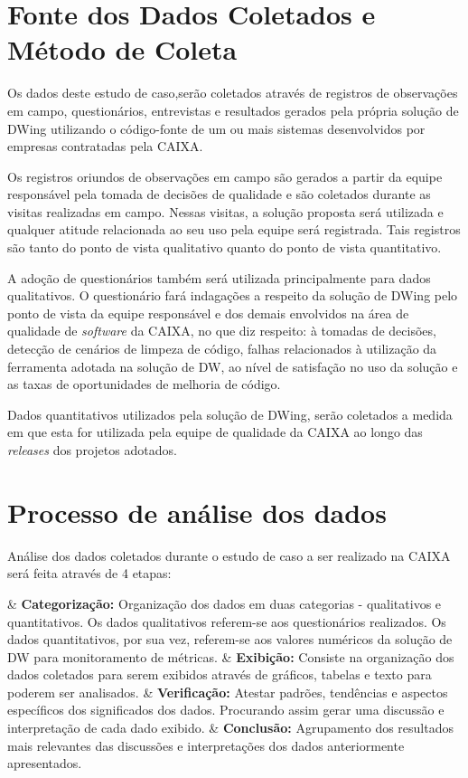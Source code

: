 \section{Fonte dos Dados Coletados e Método de Coleta}
\label{sec:fonte} 

Os dados deste estudo de caso,serão coletados através de registros de observações em campo, questionários, entrevistas e resultados gerados pela própria solução de DWing utilizando o código-fonte de um ou mais sistemas desenvolvidos por empresas contratadas pela CAIXA.

Os registros oriundos de observações em campo são gerados a partir da equipe responsável pela tomada de decisões de qualidade e são coletados durante as visitas realizadas em campo. Nessas visitas, a solução proposta será utilizada e qualquer atitude relacionada ao seu uso pela equipe será registrada. Tais registros são tanto do ponto de vista qualitativo quanto do ponto de vista quantitativo.

A adoção de questionários também será utilizada principalmente para dados qualitativos. O questionário fará indagações a respeito da solução de DWing pelo ponto de vista da equipe responsável e dos demais envolvidos na área de qualidade de \textit{software} da CAIXA, no que diz respeito: à tomadas de decisões, detecção de cenários de limpeza de código, falhas relacionados à utilização da ferramenta adotada na solução de DW, ao nível de satisfação no uso da solução e as taxas de oportunidades de melhoria de código. 

Dados quantitativos utilizados pela solução de DWing, serão coletados a medida em que esta for utilizada pela equipe de qualidade da CAIXA ao longo das \textit{releases} dos projetos adotados.

\section{Processo de análise dos dados}
\label{sec:analise} 

Análise dos dados coletados durante o estudo de caso a ser realizado na CAIXA será feita através de 4 etapas:

\begin{easylist}[itemize]	
	
	& \textbf{Categorização: } Organização dos dados em duas categorias - qualitativos e quantitativos. Os dados qualitativos referem-se aos questionários realizados. Os dados quantitativos, por sua vez, referem-se aos valores numéricos da solução de DW para monitoramento de métricas. 
	& \textbf{Exibição: } Consiste na organização dos dados coletados para serem exibidos através de gráficos, tabelas e texto para poderem ser analisados. 
	& \textbf{Verificação: } Atestar padrões, tendências e aspectos específicos dos significados dos dados. Procurando assim gerar uma discussão e interpretação de cada dado exibido.
	& \textbf{Conclusão: } Agrupamento dos resultados mais relevantes das discussões e interpretações dos dados anteriormente apresentados.
	
	\end{easylist}	


